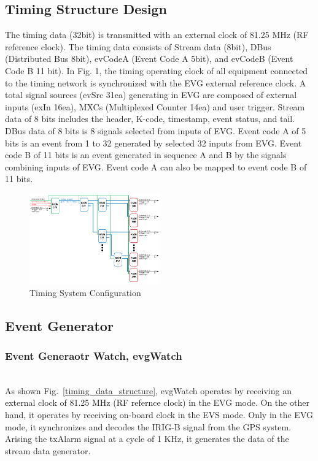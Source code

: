 \documentclass[journal]{IEEEtran}
\begin{document}
\subsection{Timing Structure Design}
The timing data (32bit) is transmitted with an external clock of 81.25 MHz (RF reference clock). The timing data consists of Stream data (8bit), DBus (Distributed Bus 8bit), evCodeA (Event Code A 5bit), and evCodeB (Event Code B 11 bit). In Fig. 1, the timing operating clock of all equipment connected to the timing network is synchronized with the EVG external reference clock. A total signal sources (evSrc 31ea) generating in EVG are composed of external inputs (exIn 16ea), MXCs (Multiplexed Counter 14ea) and user trigger. Stream data of 8 bits includes the header, K-code, timestamp, event status, and tail. DBus data of 8 bits is 8 signals selected from inputs of EVG. Event code A of 5 bits is an event from 1 to 32 generated by selected 32 inputs from EVG. Event code B of 11 bits is an event generated in sequence A and B by the signals combining inputs of EVG. Event code A can also be mapped to event code B of 11 bits.

\begin{figure}[!htb]
	\centering
	\includegraphics*[width=0.5\textwidth, height=0.4\textwidth]{img02.png}
	\caption{Timing System Configuration}
	\label{timing_system_configuration}
\end{figure}


\subsection{Event Generator}
\subsubsection{Event Generaotr Watch, evgWatch}\hspace*{\fill} \\
As shown Fig.~\ref{timing_data_structure}, evgWatch operates by receiving an external clock of 81.25 MHz (RF refernce clock) in the EVG mode. On the other hand, it operates by receiving on-board clock in the EVS mode. Only in the EVG mode, it synchronizes and decodes the IRIG-B signal from the GPS system. Arising the txAlarm signal at a cycle of 1 KHz, it generates the data of the stream data generator.\newline
\end{document}
